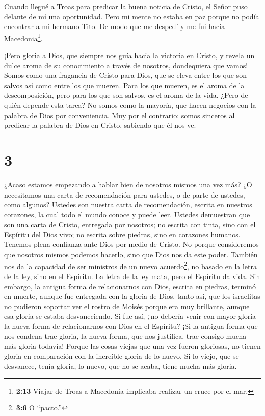  Cuando llegué a Troas para predicar la buena noticia de
Cristo, el Señor puso delante de mí una oportunidad.  Pero
mi mente no estaba en paz porque no podía encontrar a mi hermano Tito.
De modo que me despedí y me fui hacia Macedonia\footnote{\textbf{2:13}
  Viajar de Troas a Macedonia implicaba realizar un cruce por el mar.}.

 ¡Pero gloria a Dios, que siempre nos guía hacia la
victoria en Cristo, y revela un dulce aroma de su conocimiento a través
de nosotros, dondequiera que vamos!  Somos como una
fragancia de Cristo para Dios, que se eleva entre los que son salvos así
como entre los que mueren.  Para los que mueren, es el
aroma de la descomposición, pero para los que son salvos, es el aroma de
la vida. ¿Pero de quién depende esta tarea?  No somos como
la mayoría, que hacen negocios con la palabra de Dios por conveniencia.
Muy por el contrario: somos sinceros al predicar la palabra de Dios en
Cristo, sabiendo que él nos ve.

\hypertarget{section-2}{%
\section{3}\label{section-2}}

 ¿Acaso estamos empezando a hablar bien de nosotros mismos
una vez más? ¿O necesitamos una carta de recomendación para ustedes, o
de parte de ustedes, como algunos?  Ustedes son nuestra
carta de recomendación, escrita en nuestros corazones, la cual todo el
mundo conoce y puede leer.  Ustedes demuestran que son una
carta de Cristo, entregada por nosotros; no escrita con tinta, sino con
el Espíritu del Dios vivo; no escrita sobre piedras, sino en corazones
humanos.  Tenemos plena confianza ante Dios por medio de
Cristo.  No porque consideremos que nosotros mismos podemos
hacerlo, sino que Dios nos da este poder.  También nos da la
capacidad de ser ministros de un nuevo acuerdo\footnote{\textbf{3:6} O
  ``pacto.''}, no basado en la letra de la ley, sino en el Espíritu. La
letra de la ley mata, pero el Espíritu da vida.  Sin
embargo, la antigua forma de relacionarnos con Dios, escrita en piedras,
terminó en muerte, aunque fue entregada con la gloria de Dios, tanto
así, que los israelitas no pudieron soportar ver el rostro de Moisés
porque era muy brillante, aunque esa gloria se estaba desvaneciendo.
 Si fue así, ¿no debería venir con mayor gloria la nueva
forma de relacionarnos con Dios en el Espíritu?  ¡Si la
antigua forma que nos condena trae gloria, la nueva forma, que nos
justifica, trae consigo mucha más gloria todavía!  Porque
las cosas viejas que una vez fueron gloriosas, no tienen gloria en
comparación con la increíble gloria de lo nuevo.  Si lo
viejo, que se desvanece, tenía gloria, lo nuevo, que no se acaba, tiene
mucha más gloria.

